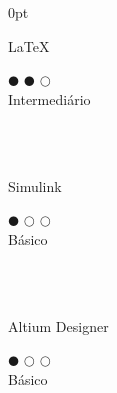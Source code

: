 \documentclass[a4paper]{article}
\begin{document}
\begin{adjustwidth}{\parindent}{0pt}
\begin{minipage}[t]{0.25\textwidth}
 \begin{minipage}{0.65\textwidth}
   \small{\LaTeX}
 \end{minipage}
 \begin{minipage}{0.3\textwidth}
   \centering $\mdlgblkcircle$ $\mdlgblkcircle$ $\mdlgwhtcircle$ \\  \footnotesize{Intermediário}
 \end{minipage} \\ \hspace{0pt} \\
 
 \begin{minipage}{0.65\textwidth}
   \small{Simulink}
 \end{minipage}
 \begin{minipage}{0.3\textwidth}
   \centering $\mdlgblkcircle$ $\mdlgwhtcircle$ $\mdlgwhtcircle$ \\  \footnotesize{Básico}
 \end{minipage} \\ \hspace{0pt} \\
 
  \begin{minipage}{0.65\textwidth}
   \small{Altium Designer}
 \end{minipage}
 \begin{minipage}{0.3\textwidth}
   \centering $\mdlgblkcircle$ $\mdlgwhtcircle$ $\mdlgwhtcircle$ \\  \footnotesize{Básico}
 \end{minipage} \\ \hspace{0pt} \\

\end{minipage}
\end{adjustwidth}
\end{document}
